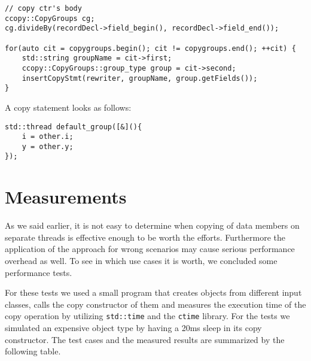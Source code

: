 \documentclass{article}
\begin{document}
\begin{verbatim}
// copy ctr's body
ccopy::CopyGroups cg;
cg.divideBy(recordDecl->field_begin(), recordDecl->field_end());

for(auto cit = copygroups.begin(); cit != copygroups.end(); ++cit) {
    std::string groupName = cit->first;
    ccopy::CopyGroups::group_type group = cit->second;
    insertCopyStmt(rewriter, groupName, group.getFields());
}
\end{verbatim}
A copy statement looks as follows:
\begin{verbatim}
std::thread default_group([&](){
    i = other.i;
    y = other.y;
});
\end{verbatim}

\section{Measurements}
\label{measurements}

As we said earlier, it is not easy to determine when copying of data members on separate threads is effective enough to be worth the efforts. Furthermore the application of the approach for wrong scenarios may cause serious performance overhead as well. To see in which use cases it is worth, we concluded some performance tests.

For these tests we used a small program that creates objects from different input classes, calls the copy constructor of them and measures the execution time of the copy operation by utilizing \texttt{std::time} and the \texttt{ctime} library. For the tests we simulated an expensive object type by having a 20ms sleep in its copy constructor. The test cases and the measured results are summarized by the following table.
\end{document}

